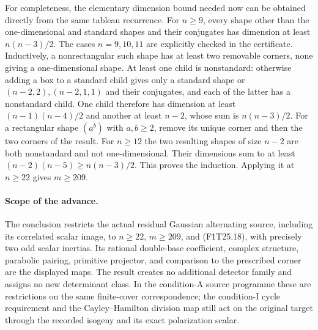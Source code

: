 For completeness, the elementary dimension bound needed
now can be obtained directly from the same tableau
recurrence. For $n\ge9$, every shape other than the
one-dimensional and standard shapes and their conjugates
has dimension at least $n(n-3)/2$. The cases $n=9,10,11$
are explicitly checked in the certificate. Inductively,
a nonrectangular such shape has at least two removable
corners, none giving a one-dimensional shape. At least
one child is nonstandard: otherwise adding a box to a
standard child gives only a standard shape or
$(n-2,2),(n-2,1,1)$ and their conjugates, and each of
the latter has a nonstandard child. One child therefore
has dimension at least $(n-1)(n-4)/2$ and another at
least $n-2$, whose sum is $n(n-3)/2$.
For a rectangular shape $(a^b)$ with $a,b\ge2$, remove
its unique corner and then the two corners of the
result. For $n\ge12$ the two resulting shapes of size
$n-2$ are both nonstandard and not one-dimensional.
Their dimensions sum to at least
$(n-2)(n-5)\ge n(n-3)/2$. This proves the induction.
Applying it at $n\ge22$ gives $m\ge209$.

\paragraph{Scope of the advance.}
The conclusion restricts the actual residual Gaussian
alternating source, including its correlated scalar image,
to $n\ge22$, $m\ge209$, and (F1T25.18), with precisely
two odd scalar inertias. Its rational double-base
coefficient, complex structure, parabolic pairing,
primitive projector, and comparison to the prescribed
corner are the displayed maps. The result creates no
additional detector family and assigns no new determinant
class. In the condition-A source programme these are
restrictions on the same finite-cover correspondence;
the condition-I cycle requirement and the Cayley--Hamilton
division map still act on the original target through
the recorded isogeny and its exact polarization scalar.
